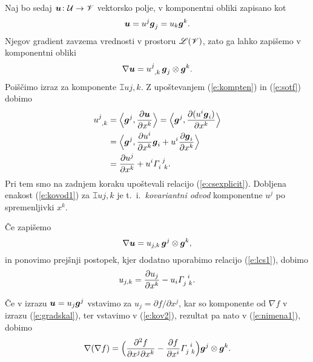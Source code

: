 Naj bo sedaj $\boldsymbol u\colon \mathcal U\to\mathscr V$ vektorsko polje, v komponentni obliki
zapisano kot
\[ \boldsymbol u=u^j\boldsymbol g_j=u_k\boldsymbol g^k. \]
Njegov gradient zavzema vrednosti v prostoru $\mathscr L(\mathscr V)$, zato ga lahko zapišemo v komponentni obliki
\begin{equation} \label{e:gradukomp}
	\nabla\vek{u}=\topbot{u}{j}{,k}\,\vek{g}_j\otimes\vek{g}^k.
\end{equation}
Poiščimo izraz za komponente $\topbot{u}{j}{,k}$. Z upoštevanjem
(\ref{e:kompten}) in (\ref{e:sotf}) dobimo
\begin{align}
	\topbot{u}{j}{,k}&=\Big<\vek{g}^j,\frac{\partial\vek{u}}{\partial x^k}\Big>=
	\Big<\vek{g}^j,\frac{\partial(u^i\vek{g}_i)}{\partial x^k}\Big> \nonumber \\
	&=\Big<\vek{g}^j,\frac{\partial u^i}{\partial x^k}\vek{g}_i+
	u^i\frac{\partial\vek{g}_i}{\partial x^k}\Big> \nonumber \\
	&=\frac{\partial u^j}{\partial x^k}+u^i\cs{i}{j}{k}. \label{e:kovod1}
\end{align}
Pri tem smo na zadnjem koraku upoštevali relacijo (\ref{e:csexplicit}). Dobljena enakost (\ref{e:kovod1})
za $\topbot{u}{j}{,k}$ je t.~i.~\emph{kovariantni odvod} komponentne $u^j$ po spremenljivki $x^k$.

Če zapišemo
\begin{equation} \label{e:nimena1}
	\nabla\boldsymbol u=u_{j,k}\,\boldsymbol g^j\otimes\boldsymbol g^k,
\end{equation}
in ponovimo prejšnji postopek, kjer dodatno uporabimo relacijo (\ref{e:lcs1}), dobimo
\begin{equation} \label{e:kov2}
	u_{j,k}=\frac{\partial u_j}{\partial x^k}-u_i\cs{j}{i}{k}.
\end{equation}
\begin{primer}
	Če v izrazu $\boldsymbol u=u_j\boldsymbol g^j$ vstavimo za $u_j=\partial f/\partial x^j$,
	kar so komponente od $\nabla f$ v izrazu (\ref{e:gradskal}), ter vstavimo v
	(\ref{e:kov2}), rezultat pa nato v (\ref{e:nimena1}), dobimo
	\begin{equation*} %
		\nabla(\nabla f)=\Big(\frac{\partial^2 f}{\partial x^j\partial x^k}-
		\frac{\partial f}{\partial x^i}\cs{j}{i}{k}\Big)\vek{g}^j\otimes\vek{g}^k.
	\end{equation*}
\end{primer}

